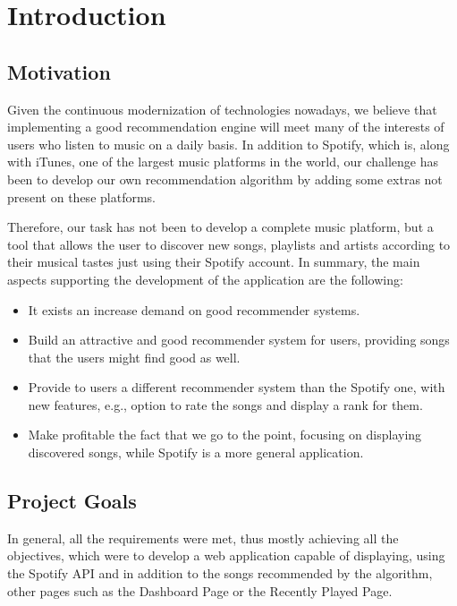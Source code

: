 \chapter{Introduction}
\label{ch:Introduction}

\section{Motivation}

Given the continuous modernization of technologies nowadays, we believe that implementing a good recommendation engine will meet many of the interests of users who listen to music on a daily basis. In addition to Spotify, which is, along with iTunes, one of the largest music platforms in the world, our challenge has been to develop our own recommendation algorithm by adding some extras not present on these platforms.

Therefore, our task has not been to develop a complete music platform, but a tool that allows the user to discover new songs, playlists and artists according to their musical tastes just using their Spotify account. In summary, the main aspects supporting the development of the application are the following:

\begin{itemize}
    \item It exists an increase demand on good recommender systems.
    \item Build an attractive and good recommender system for users, providing songs that the users might find good as well.
    \item Provide to users a different recommender system than the Spotify one, with new features, e.g., option to rate the songs and display a rank for them.
    \item Make profitable the fact that we go to the point, focusing on displaying discovered songs, while Spotify is a more general application.
\end{itemize}

\section{Project Goals}

In general, all the requirements were met, thus mostly achieving all the objectives, which were to develop a web application capable of displaying, using the Spotify API and in addition to the songs recommended by the algorithm, other pages such as the Dashboard Page or the Recently Played Page.

